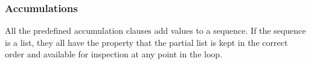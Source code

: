 
\subsubsection{Accumulations}

All the predefined accumulation clauses add values to a sequence.  If
the sequence is a list, they all 
have the property that the partial list is kept in the correct order
and available for inspection at any point in the loop.

